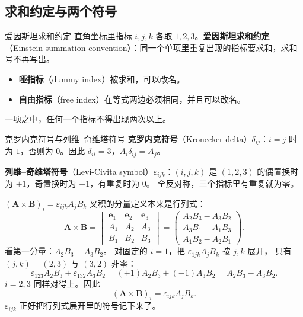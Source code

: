 \documentclass[fontset=windows, chinese, 10pt, xcolor=dvipsnames]{beamer}
\begin{document}
\subsection{求和约定与两个符号}

\begin{frame}{爱因斯坦求和约定}
  直角坐标里指标 $i,j,k$ 各取 $1,2,3$。\textbf{爱因斯坦求和约定}（Einstein summation convention）：同一个单项里重复出现的指标要求和，求和号不再写出。
  \begin{itemize}
    \item \textbf{哑指标}（dummy index）被求和，可以改名。
    \item \textbf{自由指标}（free index）在等式两边必须相同，并且可以改名。
  \end{itemize}
  一项之中，任何一个指标不得出现两次以上。
\end{frame}

\begin{frame}{克罗内克符号与列维--奇维塔符号}
  \textbf{克罗内克符号}（Kronecker delta）$\delta_{ij}$：$i=j$ 时为 $1$，否则为 $0$。因此 $\delta_{ii}=3$，$A_i\delta_{ij}=A_j$。
  \vspace{0.3em}

  \textbf{列维--奇维塔符号}（Levi-Civita symbol）$\varepsilon_{ijk}$：$(i,j,k)$ 是 $(1,2,3)$ 的偶置换时为 $+1$，奇置换时为 $-1$，有重复时为 $0$。
  全反对称，三个指标里有重复就为零。
\end{frame}

\begin{frame}{$(\mathbf{A}\times\mathbf{B})_i=\varepsilon_{ijk}A_j B_k$}
  叉积的分量定义本来是行列式：
  \begin{equation*}
    \mathbf{A}\times\mathbf{B}
    =
    \begin{vmatrix}
      \mathbf{e}_1 & \mathbf{e}_2 & \mathbf{e}_3 \\
      A_1 & A_2 & A_3 \\
      B_1 & B_2 & B_3
    \end{vmatrix}
    =
    \begin{pmatrix}
      A_2 B_3-A_3 B_2 \\
      A_3 B_1-A_1 B_3 \\
      A_1 B_2-A_2 B_1
    \end{pmatrix}.
  \end{equation*}
  看第一分量：$A_2 B_3-A_3 B_2$。
  对固定的 $i=1$，把 $\varepsilon_{1jk}A_j B_k$ 按 $j,k$ 展开，
  只有 $(j,k)=(2,3)$ 与 $(3,2)$ 非零：
  \begin{equation*}
    \varepsilon_{123}A_2 B_3+\varepsilon_{132}A_3 B_2
    =(+1)A_2 B_3+(-1)A_3 B_2
    =A_2 B_3-A_3 B_2.
  \end{equation*}
  $i=2,3$ 同样对得上。因此
  \begin{equation*}
    \boxed{(\mathbf{A}\times\mathbf{B})_i=\varepsilon_{ijk}A_j B_k.}
  \end{equation*}
  $\varepsilon_{ijk}$ 正好把行列式展开里的符号记下来了。
\end{frame}
\end{document}

